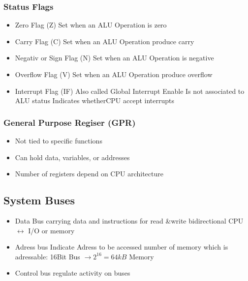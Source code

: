 \begin{multicols}{2}
	\subsubsection{Status Flags}
	\begin{itemize}
		\item Zero Flag (Z)
		\subitem Set when an \acs{ALU} Operation is zero
		\item Carry Flag (C)
		\subitem Set when an \acs{ALU} Operation produce carry
		\item Negativ or Sign Flag (N)
		\subitem Set when an \acs{ALU} Operation is negative
		\item Overflow Flag (V)
		\subitem Set when an \acs{ALU} Operation produce overflow
		\item Interrupt Flag (IF)
		\subitem Also called Global Interrupt Enable
		\subitem Is not associated to \acs{ALU} status
		\subitem Indicates whether\acs{CPU} accept interrupts
	\end{itemize}

	\subsubsection{General Purpose Regiser (\acs{GPR})}
    \begin{itemize}
        \item Not tied to specific functions
        \item Can hold data, variables, or addresses
        \item Number of registers depend on \acs{CPU} architecture			
    \end{itemize}

\end{multicols}
\subsection{System Buses }
	\begin{itemize}
		\item Data Bus
		\subitem carrying data and instructions for read \&write
		\subitem bidirectional \acs{CPU} $\leftrightarrow$ \acs{I/O} or memory
		\item Adress bus
		\subitem Indicate Adress to be accessed
		\subitem number of memory which is adressable: 16Bit Bus $\rightarrow 2^{16}=64kB$ Memory
		\item Control bus
		\subitem regulate activity on buses		
	\end{itemize}

